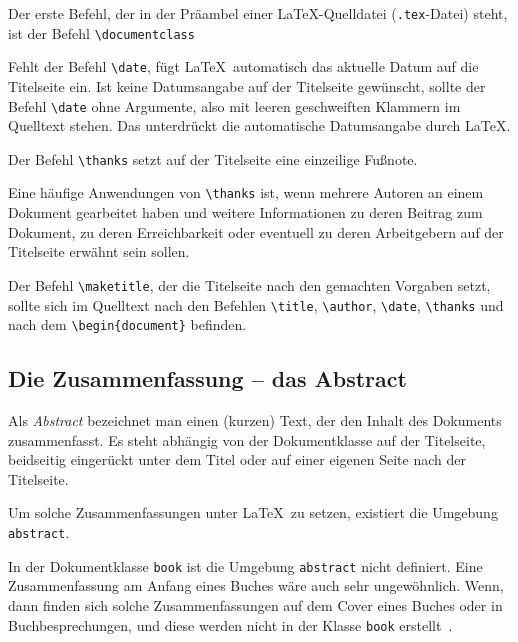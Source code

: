Der erste Befehl, der in der Präambel einer \LaTeX-Quelldatei (\verb!.tex!-Datei) steht, ist der Befehl \verb!\documentclass!
\begin{document}
Fehlt der Befehl \verb!\date!, fügt \LaTeX\ automatisch das aktuelle Datum auf die Titelseite ein. Ist keine Datumsangabe auf der Titelseite gewünscht, sollte der Befehl \verb!\date! ohne Argumente, also mit leeren geschweiften Klammern im Quelltext stehen.
Das unterdrückt die automatische Datumsangabe durch \LaTeX.

Der Befehl \verb!\thanks!
 setzt auf der Titelseite eine einzeilige Fußnote.


Eine häufige Anwendungen von \verb!\thanks! ist, wenn mehrere Autoren an einem Dokument gearbeitet haben und weitere Informationen zu deren Beitrag zum Dokument, zu deren Erreichbarkeit oder eventuell zu deren Arbeitgebern auf der Titelseite erwähnt sein sollen. 

Der Befehl \verb!\maketitle!, 
der die Titelseite nach den gemachten Vorgaben setzt, sollte sich im Quelltext nach den Befehlen \verb!\title!, \verb!\author!, \verb!\date!, \verb!\thanks! und nach dem \verb!\begin{document}! befinden.



\subsection{Die Zusammenfassung -- das Abstract}

Als \textsl{Abstract} bezeichnet man einen (kurzen) Text, der den Inhalt des
Dokuments zusammenfasst. 
Es steht abhängig von der Dokumentklasse 
auf der Titelseite, beidseitig eingerückt unter dem Titel oder auf einer
eigenen Seite nach der Titelseite. 

Um solche Zusammenfassungen unter 
\LaTeX\ zu setzen, existiert die
Umgebung \verb!abstract!.


In der Dokumentklasse \verb!book! ist
die Umgebung \verb!abstract!
nicht definiert.
Eine Zusammenfassung am Anfang eines 
Buches wäre auch sehr ungewöhnlich. Wenn,
dann finden sich solche Zusammenfassungen 
auf dem Cover eines Buches oder in
Buchbesprechungen, und diese werden 
nicht in der Klasse \verb!book! erstellt~\cite{Kopka2000}.
\end{document}
